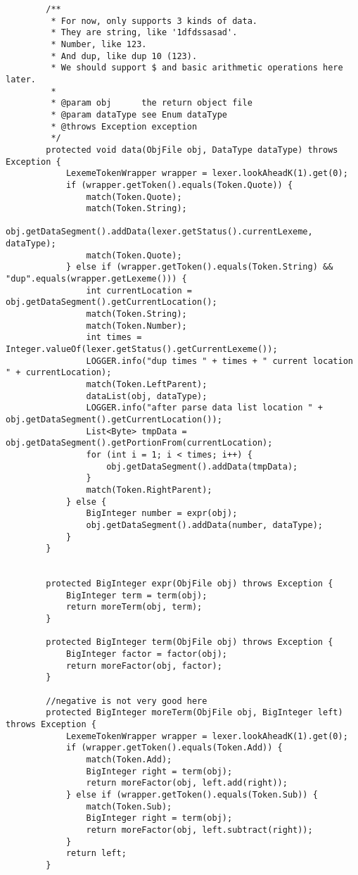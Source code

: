 \documentclass[12pt]{extarticle}
\begin{document}
\begin{enumerate}
\begin{lstlisting}
        /**
         * For now, only supports 3 kinds of data.
         * They are string, like '1dfdssasad'.
         * Number, like 123.
         * And dup, like dup 10 (123).
         * We should support $ and basic arithmetic operations here later.
         *
         * @param obj      the return object file
         * @param dataType see Enum dataType
         * @throws Exception exception
         */
        protected void data(ObjFile obj, DataType dataType) throws Exception {
            LexemeTokenWrapper wrapper = lexer.lookAheadK(1).get(0);
            if (wrapper.getToken().equals(Token.Quote)) {
                match(Token.Quote);
                match(Token.String);
                obj.getDataSegment().addData(lexer.getStatus().currentLexeme, dataType);
                match(Token.Quote);
            } else if (wrapper.getToken().equals(Token.String) && "dup".equals(wrapper.getLexeme())) {
                int currentLocation = obj.getDataSegment().getCurrentLocation();
                match(Token.String);
                match(Token.Number);
                int times = Integer.valueOf(lexer.getStatus().getCurrentLexeme());
                LOGGER.info("dup times " + times + " current location " + currentLocation);
                match(Token.LeftParent);
                dataList(obj, dataType);
                LOGGER.info("after parse data list location " + obj.getDataSegment().getCurrentLocation());
                List<Byte> tmpData = obj.getDataSegment().getPortionFrom(currentLocation);
                for (int i = 1; i < times; i++) {
                    obj.getDataSegment().addData(tmpData);
                }
                match(Token.RightParent);
            } else {
                BigInteger number = expr(obj);
                obj.getDataSegment().addData(number, dataType);
            }
        }
    
    
        protected BigInteger expr(ObjFile obj) throws Exception {
            BigInteger term = term(obj);
            return moreTerm(obj, term);
        }
    
        protected BigInteger term(ObjFile obj) throws Exception {
            BigInteger factor = factor(obj);
            return moreFactor(obj, factor);
        }
    
        //negative is not very good here
        protected BigInteger moreTerm(ObjFile obj, BigInteger left) throws Exception {
            LexemeTokenWrapper wrapper = lexer.lookAheadK(1).get(0);
            if (wrapper.getToken().equals(Token.Add)) {
                match(Token.Add);
                BigInteger right = term(obj);
                return moreFactor(obj, left.add(right));
            } else if (wrapper.getToken().equals(Token.Sub)) {
                match(Token.Sub);
                BigInteger right = term(obj);
                return moreFactor(obj, left.subtract(right));
            }
            return left;
        }
    

\end{lstlisting}
\end{enumerate}
\end{document}
